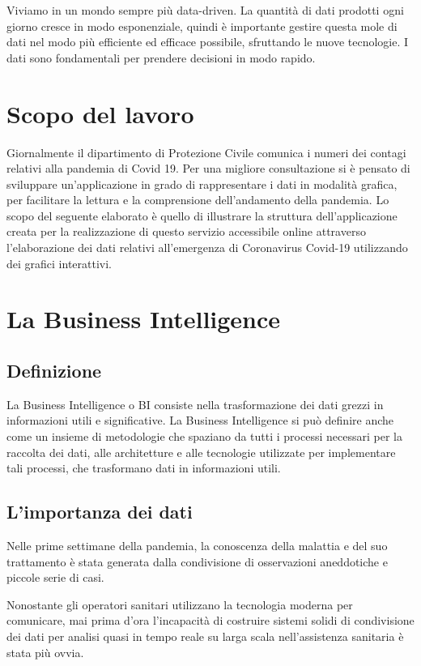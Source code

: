 
Viviamo in un mondo sempre più data-driven. La quantità di dati prodotti ogni giorno cresce in modo esponenziale, quindi è importante gestire questa mole di dati nel modo più efficiente ed efficace possibile, sfruttando le nuove tecnologie.
I dati sono fondamentali per prendere decisioni in modo rapido.

\section{Scopo del lavoro}

Giornalmente il dipartimento di Protezione Civile comunica i numeri dei contagi relativi alla pandemia di Covid 19.
Per una migliore consultazione si è pensato di sviluppare  un’applicazione in grado di rappresentare i dati in modalità grafica, per facilitare la lettura e la comprensione dell’andamento della pandemia.
Lo scopo del seguente elaborato è quello di illustrare la struttura dell'applicazione creata per la realizzazione di questo servizio accessibile online attraverso l’elaborazione dei dati relativi all’emergenza di Coronavirus Covid-19 utilizzando dei grafici interattivi.

\section{La Business Intelligence}
\subsection{Definizione}
La Business Intelligence o BI consiste nella trasformazione dei dati grezzi in informazioni utili e significative.
La Business Intelligence si può definire anche come un insieme di metodologie che spaziano da tutti i processi necessari per la raccolta dei dati, alle architetture e alle tecnologie  utilizzate per implementare tali processi, che trasformano dati in informazioni utili.

\subsection{L'importanza dei dati}
Nelle prime settimane della pandemia, la conoscenza della malattia e del suo trattamento è stata generata dalla condivisione di osservazioni aneddotiche e piccole serie di casi.

\noindent Nonostante gli operatori sanitari utilizzano la tecnologia moderna per comunicare, mai prima d'ora l'incapacità di costruire sistemi solidi di condivisione dei dati per analisi quasi in tempo reale su larga scala nell'assistenza sanitaria è stata più ovvia.


